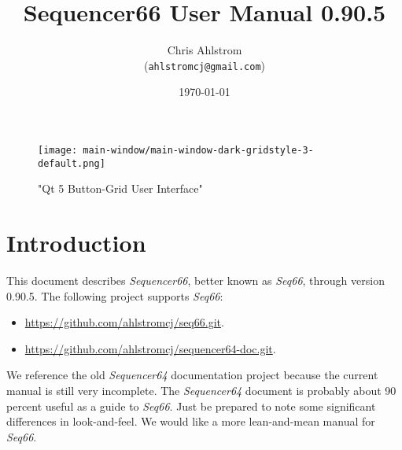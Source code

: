 \documentclass[
 11pt,
 twoside,
 a4paper,
 headinclude,
 footinclude,
 final                                 %
]{article}
\begin{document}
\title{Sequencer66 User Manual 0.90.5}
\author{Chris Ahlstrom \\
   (\texttt{ahlstromcj@gmail.com})}
\date{\today}
\maketitle


\begin{figure}[H]
   \centering 
   \texttt{[image: main-window/main-window-dark-gridstyle-3-default.png]}
   \caption*{"Qt 5 Button-Grid User Interface"}
\end{figure}

\clearpage                             %

\tableofcontents
\listoffigures                         %
\listoftables                          %


\setlength{\parindent}{2em}
\setlength{\parskip}{1ex plus 0.5ex minus 0.2ex}

\section{Introduction}
\label{sec:introduction}

   This document describes \textsl{Sequencer66}, better known as
   \textsl{Seq66},
   through version 0.90.5.
   The following project supports \textsl{Seq66}:

   \begin{itemize}
      \item \url{https://github.com/ahlstromcj/seq66.git}.
      \item \url{https://github.com/ahlstromcj/sequencer64-doc.git}.
   \end{itemize}

   We reference the old \textsl{Sequencer64} documentation project because
   the current manual is still very incomplete.  The \textsl{Sequencer64}
   document is probably about 90 percent useful as a guide to \textsl{Seq66}.
   Just be prepared to note some significant differences in look-and-feel.
   We would like a more lean-and-mean manual for \textsl{Seq66}.
\end{document}
